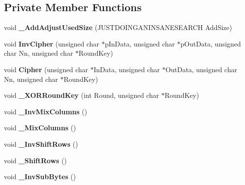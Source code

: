 \subsection*{Private Member Functions}
\begin{DoxyCompactItemize}
\item 
\hypertarget{classcl_packet_aaaf3d619a5fa7bb4e11ac9b489de8a60}{
void {\bfseries \_\-AddAdjustUsedSize} (JUSTDOINGANINSANESEARCH AddSize)}
\label{classcl_packet_aaaf3d619a5fa7bb4e11ac9b489de8a60}

\item 
\hypertarget{classcl_packet_aaf020aaa679dd5594807f51cb5bbffc5}{
void {\bfseries InvCipher} (unsigned char $\ast$pInData, unsigned char $\ast$pOutData, unsigned char Nn, unsigned char $\ast$RoundKey)}
\label{classcl_packet_aaf020aaa679dd5594807f51cb5bbffc5}

\item 
\hypertarget{classcl_packet_afa2d699d0a35387cdb4f7f6ea9e5b8ed}{
void {\bfseries Cipher} (unsigned char $\ast$InData, unsigned char $\ast$OutData, unsigned char Nn, unsigned char $\ast$RoundKey)}
\label{classcl_packet_afa2d699d0a35387cdb4f7f6ea9e5b8ed}

\item 
\hypertarget{classcl_packet_ab16466c8439d463adc39fbf5877cdfc2}{
void {\bfseries \_\-XORRoundKey} (int Round, unsigned char $\ast$RoundKey)}
\label{classcl_packet_ab16466c8439d463adc39fbf5877cdfc2}

\item 
\hypertarget{classcl_packet_af72caeaba0de8699017497c4847c9f25}{
void {\bfseries \_\-InvMixColumns} ()}
\label{classcl_packet_af72caeaba0de8699017497c4847c9f25}

\item 
\hypertarget{classcl_packet_a88d2b44bd16c1ed05fc5464ec83f1804}{
void {\bfseries \_\-MixColumns} ()}
\label{classcl_packet_a88d2b44bd16c1ed05fc5464ec83f1804}

\item 
\hypertarget{classcl_packet_a330b069209244fb4cb73e6bf7352d4a2}{
void {\bfseries \_\-InvShiftRows} ()}
\label{classcl_packet_a330b069209244fb4cb73e6bf7352d4a2}

\item 
\hypertarget{classcl_packet_a90eb10d441aebe64740edf4efbbc6e3c}{
void {\bfseries \_\-ShiftRows} ()}
\label{classcl_packet_a90eb10d441aebe64740edf4efbbc6e3c}

\item 
\hypertarget{classcl_packet_aa557b640d317e22e474edba007dafde6}{
void {\bfseries \_\-InvSubBytes} ()}
\label{classcl_packet_aa557b640d317e22e474edba007dafde6}


\end{DoxyCompactItemize}
